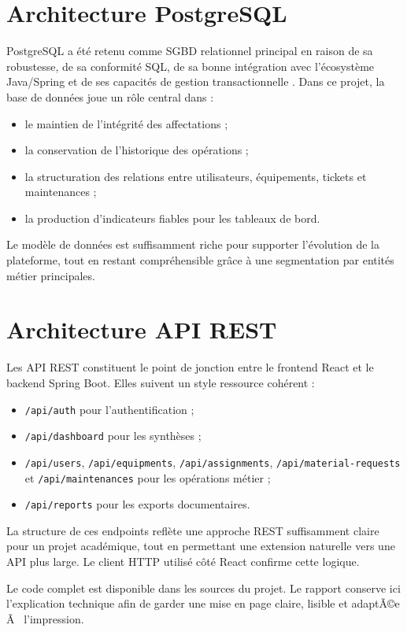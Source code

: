 ﻿\documentclass[12pt,a4paper,oneside]{report}
\newenvironment{codeblock}[1][]{
  \par
  \captionsetup{type=figure}
}{
  \par
}
\begin{document}
\section{Architecture PostgreSQL}
PostgreSQL a été retenu comme SGBD relationnel principal en raison de sa robustesse, de sa conformité SQL, de sa bonne intégration avec l'écosystème Java/Spring et de ses capacités de gestion transactionnelle \cite{postgresdocs}. Dans ce projet, la base de données joue un rôle central dans :
\begin{itemize}
  \item le maintien de l'intégrité des affectations ;
  \item la conservation de l'historique des opérations ;
  \item la structuration des relations entre utilisateurs, équipements, tickets et maintenances ;
  \item la production d'indicateurs fiables pour les tableaux de bord.
\end{itemize}

Le modèle de données est suffisamment riche pour supporter l'évolution de la plateforme, tout en restant compréhensible grâce à une segmentation par entités métier principales.

\section{Architecture API REST}
Les API REST constituent le point de jonction entre le frontend React et le backend Spring Boot. Elles suivent un style ressource cohérent :
\begin{itemize}
  \item \texttt{/api/auth} pour l'authentification ;
  \item \texttt{/api/dashboard} pour les synthèses ;
  \item \texttt{/api/users}, \texttt{/api/equipments}, \texttt{/api/assignments}, \texttt{/api/material-requests} et \texttt{/api/maintenances} pour les opérations métier ;
  \item \texttt{/api/reports} pour les exports documentaires.
\end{itemize}

La structure de ces endpoints reflète une approche REST suffisamment claire pour un projet académique, tout en permettant une extension naturelle vers une API plus large. Le client HTTP utilisé côté React confirme cette logique.

\begin{codeblock}[H]
\caption{Client HTTP Axios et propagation du jeton d'accès}
\begin{keybox}
Le code complet est disponible dans les sources du projet. Le rapport conserve ici l'explication technique afin de garder une mise en page claire, lisible et adaptÃ©e Ã  l'impression.
\end{keybox}
\end{codeblock}
\end{document}
